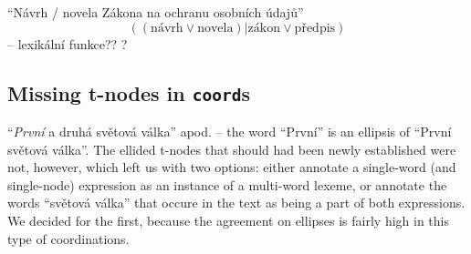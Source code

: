 \documentclass[11pt, a4paper, twopage, titlepage]{book}
\def\code{\texttt}
\begin{document}
``Návrh / novela Zákona na ochranu osobních údajů''  $$((\mathrm{návrh} \lor \mathrm{novela}) | \mathrm{zákon} \lor \mathrm{předpis})$$
-- lexikální funkce?? \citep{melcuk:1992} ?

\subsection{Missing t-nodes in \code{coord}s}
``\textit{První} a druhá světová válka'' apod. -- the word ``První'' is an ellipsis of ``První světová válka''. The ellided t-nodes that should had been newly established were not, however, which left us with two options: either annotate a single-word (and single-node) expression as an instance of a multi-word lexeme, or annotate the words ``světová válka'' that occure in the text as being a part of both expressions. We decided for the first, because the agreement on ellipses is fairly high in this type of coordinations.

\mainmatter













\end{document}

